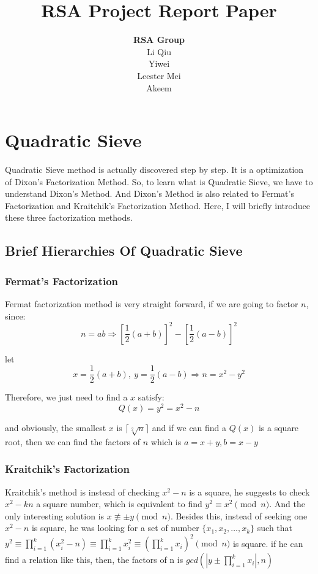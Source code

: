 \documentclass[12pt]{article} %
\title{RSA Project Report Paper}
\author{\textbf{RSA Group}\\Li Qiu\\Yiwei \\Leester Mei\\Akeem}
\begin{document}
\maketitle

\section{Quadratic Sieve}

Quadratic Sieve method is actually discovered step by step. It is a optimization of Dixon's Factorization Method. So, to learn what is Quadratic Sieve, we have to understand Dixon's Method. And Dixon's Method is also related to Fermat's Factorization and Kraitchik's Factorization Method. Here, I will briefly introduce these three factorization methods.

\subsection {Brief Hierarchies Of Quadratic Sieve}

\subsubsection {Fermat's Factorization}
Fermat factorization method is very straight forward, if we are going to factor $n$, since: $$n = ab \Rightarrow \left [\frac{1}{2}(a+b) \right ]^{2} - \left [\frac{1}{2}(a-b) \right ]^{2}$$

let $$ x= \frac{1}{2}(a+b),\ y= \frac{1}{2}(a-b) \Rightarrow n = x^2 - y^2$$ 

Therefore, we just need to find a $x$ satisfy: $$Q(x) = y^2 = x^2 - n$$ 

and obviously, the smallest $x$ is $\lceil \sqrt[2]{n}\rceil$ and if we can find a $Q(x)$ is a square root, then we can find the factors of $n$ which is $a=x+y, b=x-y$

\subsubsection {Kraitchik's Factorization}
Kraitchik's method is instead of checking $x^2-n$ is a square, he suggests to check $x^2 - kn$ a square number, which is equivalent to find $y^2 \equiv x^2 \pmod{n} $. And the only interesting solution is $ x \not\equiv \pm y \pmod{n}$. Besides this, instead of seeking one $x^2-n$ is square, he was looking for a set of number $ \{x_1, x_2, \dots, x_k\} $ such that $\displaystyle y^2 \equiv \prod_{i=1}^k{(x_i^2 - n)} \equiv \prod_{i=1}^k{x_i^2} \equiv \left (\prod_{i=1}^k{x_i}\right)^2 \pmod{n} $ is square. if he can find a relation like this, then, the factors of n is $\displaystyle gcd(|y \pm \prod_{i=1}^k{x_i}|, n)$
\end{document}
